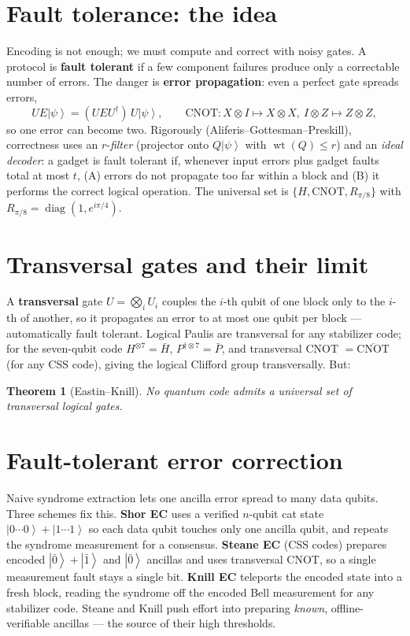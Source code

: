\documentclass[11pt]{article}
\newcommand{\ket}[1]{\left|#1\right\rangle}
\newcommand{\wt}{\operatorname{wt}}
\DeclareMathOperator{\diag}{diag}
\theoremstyle{plain}
\newtheorem*{theorem*}{Theorem}
\begin{document}
\section{Fault tolerance: the idea}
Encoding is not enough; we must compute and correct with noisy gates. A protocol is \textbf{fault
tolerant} if a few component failures produce only a correctable number of errors. The danger is
\textbf{error propagation}: even a perfect gate spreads errors,
\[ U E\ket{\psi} = (UEU^\dagger)\,U\ket{\psi},\qquad \text{CNOT}: X\otimes I\mapsto X\otimes X,\
   I\otimes Z\mapsto Z\otimes Z, \]
so one error can become two. Rigorously (Aliferis--Gottesman--Preskill), correctness uses an
$r$-\emph{filter} (projector onto $Q\ket{\psi}$ with $\wt(Q)\le r$) and an \emph{ideal decoder}: a
gadget is fault tolerant if, whenever input errors plus gadget faults total at most $t$, (A) errors
do not propagate too far within a block and (B) it performs the correct logical operation. The
universal set is $\{H,\text{CNOT},R_{\pi/8}\}$ with $R_{\pi/8}=\diag(1,e^{i\pi/4})$.

\section{Transversal gates and their limit}
A \textbf{transversal} gate $U=\bigotimes_i U_i$ couples the $i$-th qubit of one block only to the
$i$-th of another, so it propagates an error to at most one qubit per block --- automatically fault
tolerant. Logical Paulis are transversal for any stabilizer code; for the seven-qubit code
$H^{\otimes 7}=\bar H$, $P^{\dagger\otimes 7}=\bar P$, and transversal CNOT $=\overline{\text{CNOT}}$
(for any CSS code), giving the logical Clifford group transversally. But:

\begin{theorem*}[Eastin--Knill]
No quantum code admits a universal set of transversal logical gates.
\end{theorem*}

\section{Fault-tolerant error correction}
Naive syndrome extraction lets one ancilla error spread to many data qubits. Three schemes fix this.
\textbf{Shor EC} uses a verified $n$-qubit cat state $\ket{0\cdots0}+\ket{1\cdots1}$ so each data qubit
touches only one ancilla qubit, and repeats the syndrome measurement for a consensus.
\textbf{Steane EC} (CSS codes) prepares encoded $\ket{\bar0}+\ket{\bar1}$ and $\ket{\bar0}$ ancillas
and uses transversal CNOT, so a single measurement fault stays a single bit. \textbf{Knill EC}
teleports the encoded state into a fresh block, reading the syndrome off the encoded Bell measurement
for any stabilizer code. Steane and Knill push effort into preparing \emph{known}, offline-verifiable
ancillas --- the source of their high thresholds.
\end{document}
